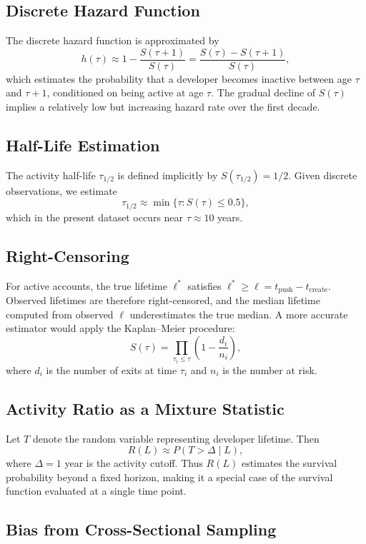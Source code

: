 \documentclass[12pt,a4paper]{article}
\begin{document}
\subsection{Discrete Hazard Function}

The discrete hazard function is approximated by
\[
h(\tau) \approx 1 - \frac{S(\tau+1)}{S(\tau)} = \frac{S(\tau) - S(\tau+1)}{S(\tau)},
\]
which estimates the probability that a developer becomes inactive between age $\tau$ and $\tau+1$, conditioned on being active at age $\tau$. The gradual decline of $S(\tau)$ implies a relatively low but increasing hazard rate over the first decade.

\subsection{Half-Life Estimation}

The activity half-life $\tau_{1/2}$ is defined implicitly by $S(\tau_{1/2}) = 1/2$. Given discrete observations, we estimate
\[
\tau_{1/2} \approx \min\{\tau : S(\tau) \leq 0.5\},
\]
which in the present dataset occurs near $\tau \approx 10$ years.

\subsection{Right-Censoring}

For active accounts, the true lifetime $\ell^*$ satisfies $\ell^* \geq \ell = t_{\text{push}} - t_{\text{create}}$. Observed lifetimes are therefore right-censored, and the median lifetime computed from observed $\ell$ underestimates the true median. A more accurate estimator would apply the Kaplan--Meier procedure:
\[
\hat{S}(\tau) = \prod_{\tau_i \leq \tau} \left(1 - \frac{d_i}{n_i}\right),
\]
where $d_i$ is the number of exits at time $\tau_i$ and $n_i$ is the number at risk.

\subsection{Activity Ratio as a Mixture Statistic}

Let $T$ denote the random variable representing developer lifetime. Then
\[
R(L) \approx P(T > \Delta \mid L),
\]
where $\Delta = 1$ year is the activity cutoff. Thus $R(L)$ estimates the survival probability beyond a fixed horizon, making it a special case of the survival function evaluated at a single time point.

\subsection{Bias from Cross-Sectional Sampling}
\end{document}
